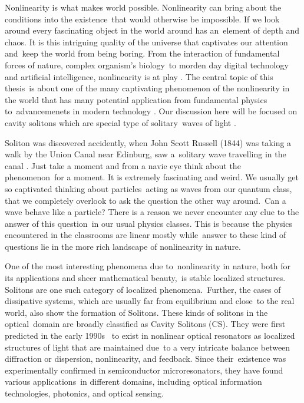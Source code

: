 
Nonlinearity is what makes world possible. Nonlinearity can bring about the conditions into the existence\ 
that would otherwise be impossible. If we look around every fascinating object in the world around has an\
element of depth and chaos. It is this intriguing quality of the universe that captivates our attention and\
keep the world from being boring. From the interaction of fundamental forces of nature, complex organism's biology\
to morden day digital technology and artificial intelligence, nonlinearity is at play \cite{feldmanChaosFractalsElementary2012,lakshmananNonlinearDynamics2003,strogatzNonlinearDynamicsChaos2018}. The central topic of this thesis\
is about one of the many captivating phenomenon of the nonlinearity in the world that has many potential application from fundamental physics to\
advancemenets in modern technology \cite{ackemannFundamentalsApplicationsSpatial}. Our discussion here will be focused on cavity solitons which are special type of solitary\
waves of light \cite{lugiatoIntroductionFeatureSection2003,ackemannFundamentalsApplicationsSpatial}. 

    Soliton was discovered accidently, when John Scott Russell (1844) was taking a walk by the Union Canal near Edinburg, saw a\
solitary wave travelling in the canal \cite{russellReportWavesMade}. Just take a moment and from a navie eye think about the phenomenon\
for a moment. It is extremely fascinating and weird. We usually get so captivated thinking about particles\ 
acting as waves from our quantum class, that we completely overlook to ask the question the other way around.\
Can a wave behave like a particle? There is a reason we never encounter any clue to the answer of this question\
in our usual physics classes. This is because the physics encountered in the classrooms are linear mostly while\
answer to these kind of questions lie in the more rich landscape of nonlinearity in nature.

One of the most interesting phenomena due to\
nonlinearity in nature, both for its applications and sheer mathematical beauty,\
is stable localized structures. Solitons are one such category of localized phenomena.\
Further, the cases of dissipative systems, which are usually far from equilibrium and close\
to the real world, also show the formation of Solitons. These kinds of solitons in the optical\
domain are broadly classified as Cavity Solitons (CS). They were first predicted in the early 1990s \cite{newellNonlinearOptics1992,firthTheoryCavitySolitons2001}\
to exist in nonlinear optical resonators as localized structures of light that are maintained due\
to a very intricate balance between diffraction or dispersion, nonlinearity, and feedback. Since their\
existence was experimentally confirmed in semiconductor microresonators, they have found various applications\
in different domains, including optical information technologies, photonics, and optical sensing. 

